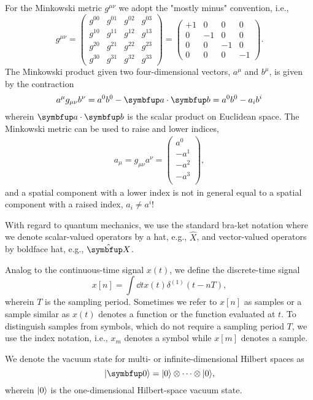 For the Minkowski metric $g^{\mu\nu}$ we adopt the "mostly minus" convention, i.e.,
\begin{equation*}
	g^{\mu\nu}
	=
	\begin{pmatrix}
		g^{00} & g^{01} & g^{02} & g^{03} \\
		g^{10} & g^{11} & g^{12} & g^{13} \\
		g^{20} & g^{21} & g^{22} & g^{23} \\
		g^{30} & g^{31} & g^{32} & g^{33}
	\end{pmatrix}
	=
	\begin{pmatrix}
		+1 & 0 & 0 & 0 \\
		0 & -1 & 0 & 0 \\
		0 & 0 & -1 & 0 \\
		0 & 0 & 0 & -1
	\end{pmatrix}
	.
\end{equation*}
The Minkowski product given two four-dimensional vectors, $a^\mu$ and $b^\mu$, is given by the contraction
\begin{equation*}
	a^\mu g_{\mu\nu} b^\nu
	=
	a^0 b^0
	-
	\vb{a}\vdot\vb{b}
	=
	a^0 b^0
	-
	a_i b^i
\end{equation*}
wherein $\vb{a}\vdot\vb{b}$ is the scalar product on Euclidean space.
The Minkowski metric can be used to raise and lower indices,
\begin{align*}
	a_\mu
	=
	g_{\mu\nu}
	a^\nu
	=
	\begin{pmatrix}
		a^0 \\
		-a^1 \\
		-a^2 \\
		-a^3 \\
	\end{pmatrix}
	,
\end{align*}
and a spatial component with a lower index is not in general equal to a spatial component with a raised index, $a_i\neq a^i$!

With regard to quantum mechanics, we use the standard bra-ket notation where we denote scalar-valued operators by a hat, e.g., $\hat{X}$, and vector-valued operators by boldface hat, e.g., $\vu{X}$.

Analog to the continuous-time signal $x(t)$, we define the discrete-time signal
\begin{equation*}
	x[n]
	=
	\int\dd{t}
	x(t)
	\delta^{(1)}(t-nT)
	,
\end{equation*}
wherein $T$ is the sampling period.
Sometimes we refer to $x[n]$ as samples or a sample similar as $x(t)$ denotes a function or the function evaluated at $t$.
To distinguish samples from symbols, which do not require a sampling period $T$, we use the index notation, i.e., $x_m$ denotes a symbol while $x[m]$ denotes a sample.

We denote the vacuum state for multi- or infinite-dimensional Hilbert spaces as
\begin{equation*}
	\vacket
	=
	\ket{0}
	\otimes
	\cdots
	\otimes
	\ket{0}
	,
\end{equation*}
wherein $\lvert0\rangle$ is the one-dimensional Hilbert-space vacuum state.